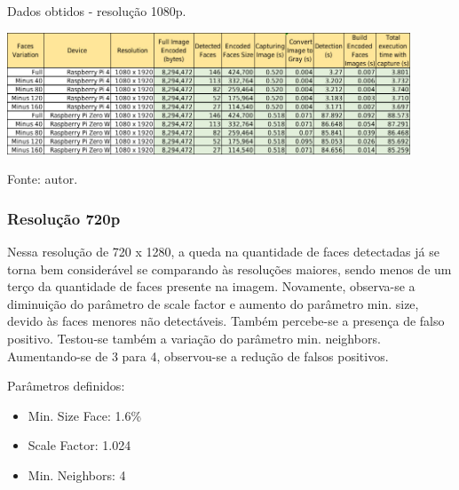 \begin{table}
    \centering
    \caption[Dados obtidos - resolução 1080p.]{Dados obtidos - resolução 1080p.}
    \includegraphics[width=0.90\textwidth]{Cap4_Experimentos_Realizados/Figures/cena1_dados_1080p.jpg}
    \caption*{Fonte: autor.}
    \label{fig:dadosCena1_1080p}
\end{table}

\subsubsection{Resolução 720p} \label{sssec:resolution1-3}

Nessa resolução de 720 x 1280, a queda na quantidade de faces detectadas já se torna bem considerável se comparando às resoluções maiores, sendo menos de um terço da quantidade de faces presente na imagem. Novamente, observa-se a diminuição do parâmetro de scale factor e aumento do parâmetro min. size, devido às faces menores não detectáveis.
Também percebe-se a presença de falso positivo. Testou-se também a variação do parâmetro min. neighbors. Aumentando-se de 3 para 4, observou-se a redução de falsos positivos.

Parâmetros definidos: 
\begin{itemize}
    \item Min. Size Face: 1.6\%
    \item Scale Factor: 1.024
    \item Min. Neighbors: 4
\end{itemize}

